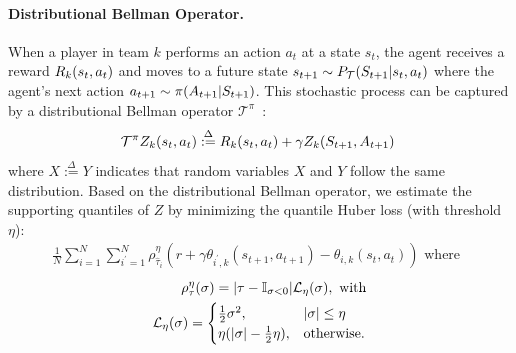 \documentclass{article}
\newcommand{\state}{s}
\newcommand{\action}{a}
\newcommand{\transition}{t}
\newcommand{\reward}{r}
\newcommand{\agentIndex}{k}
\newcommand{\quantielIndex}{i}
\newcommand{\expect}{\mathbb{E}}
\begin{document}
\paragraph{Distributional Bellman Operator.}
When a player in team $\agentIndex$ performs an action $\action_t$
at a state $\state_t$, the agent receives a reward $\MakeUppercase{\reward}_{\agentIndex}(\state_t,\action_t)$ and moves to a future state $\state_{t+1}\sim P_{\mathcal{\MakeUppercase{\transition}}}(\MakeUppercase{\state}_{t+1}|\state_t,\action_t)$ where the agent's next action $\action_{t+1}\sim\pi(\MakeUppercase{\action}_{t+1}|\MakeUppercase{\state}_{t+1})$. This stochastic process can be captured by a distributional Bellman operator $\mathcal{T}^{\pi}$~\cite{bellemare2017distributional}:
\vspace{-0.05in}
\begin{equation}
    \mathcal{T}^{\pi}{Z}_{\agentIndex}(\state_t,\action_t) \overset{\Delta}{:=} \MakeUppercase{\reward}_{\agentIndex}(\state_t,\action_t) + \gamma {Z}_{\agentIndex}(\MakeUppercase{\state}_{t+1},\MakeUppercase{\action}_{t+1})~\label{eqn:bellman-operator}
    \vspace{-0.05in}
\end{equation}
where $X\overset{\Delta}{:=}Y$ indicates that random variables $X$ and $Y$ follow the same distribution.
Based on the distributional Bellman operator, we estimate the supporting quantiles of $Z$ by minimizing the quantile Huber loss (with threshold $\eta$):
\vspace{-0.05in}
\begin{align}
    \frac{1}{N}\sum_{\quantielIndex=1}^N\sum_{\quantielIndex^{\prime}=1}^N\rho^{\eta}_{\hat{\tau}_\quantielIndex}(\reward+\gamma\theta_{\quantielIndex^{\prime},\agentIndex}(\state_{t+1},\action_{t+1})-\theta_{\quantielIndex,\agentIndex}(\state_{t},\action_{t})) \text{ where }\nonumber~\label{eq:huber}
\end{align}
\vspace{-0.2in}
\begin{align}
    \begin{split}
    \rho_{\tau}^{\eta}(\sigma) = |\tau - \mathbb{I}_{\sigma<0}|\mathcal{L}_{\eta}(\sigma),~\mathrm{with} \\
    \mathcal{L}_{\eta}(\sigma) = \begin{cases}
    \tfrac12 \sigma^2, & |\sigma| \leq \eta\\
    \eta(|\sigma|-\frac12 \eta), & \mathrm{otherwise}.
\end{cases}
\end{split}
\vspace{-0.05in}
\end{align}
\end{document}
